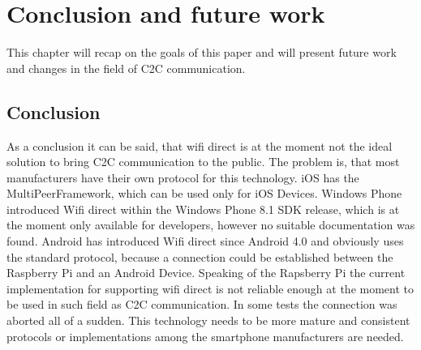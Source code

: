 \chapter{Conclusion and future work}
\label{cha:ConclusionFutureWork}
This chapter will recap on the goals of this paper and will present future work and changes in the field of C2C communication.

\section{Conclusion}
\label{sec:Conclusion}
As a conclusion it can be said, that wifi direct is at the moment not the ideal solution to bring C2C communication to the public. The problem is, that most manufacturers have their own protocol for this technology. iOS has the MultiPeerFramework, which can be used only for iOS Devices. Windows Phone introduced Wifi direct within the Windows Phone 8.1 SDK release, which is at the moment only available for developers, however no suitable documentation was found. Android has introduced Wifi direct since Android 4.0 and obviously uses the standard protocol, because a connection could be established between the Raspberry Pi and an Android Device. Speaking of the Rapsberry Pi the current implementation for supporting wifi direct is not reliable enough at the moment to be used in such field as C2C communication. In some tests the connection was aborted all of a sudden. This technology needs to be more mature and consistent protocols or implementations among the smartphone manufacturers are needed.

